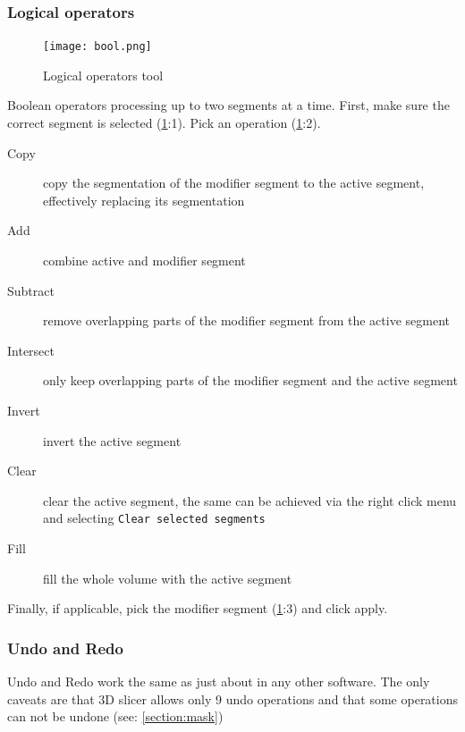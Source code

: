\pagebreak

\subsubsection{Logical operators}
\begin{figure}[h!]
	\centerline{
		\texttt{[image: bool.png]}}
	\caption{Logical operators tool}\label{fig:bool}
\end{figure}
\noindent
Boolean operators processing up to two segments at a time.
First, make sure the correct segment is selected (\cref{fig:bool}:1).
Pick an operation (\cref{fig:bool}:2).
\begin{description}
	\item [Copy] copy the segmentation of the modifier segment to the active segment, effectively replacing its segmentation
	\item [Add] combine active and modifier segment
	\item [Subtract] remove overlapping parts of the modifier segment from the active segment
	\item [Intersect] only keep overlapping parts of the modifier segment and the active segment
	\item [Invert] invert the active segment
	\item [Clear] clear the active segment, the same can be achieved via the right click menu and selecting \texttt{Clear selected segments}
	\item [Fill] fill the whole volume with the active segment
\end{description}
Finally, if applicable, pick the modifier segment (\cref{fig:bool}:3) and click apply.

\subsubsection{Undo and Redo}
Undo and Redo work the same as just about in any other software.
The only caveats are that 3D slicer allows only 9 undo operations and that some operations can not be undone (see: \cref{section:mask})
\pagebreak


